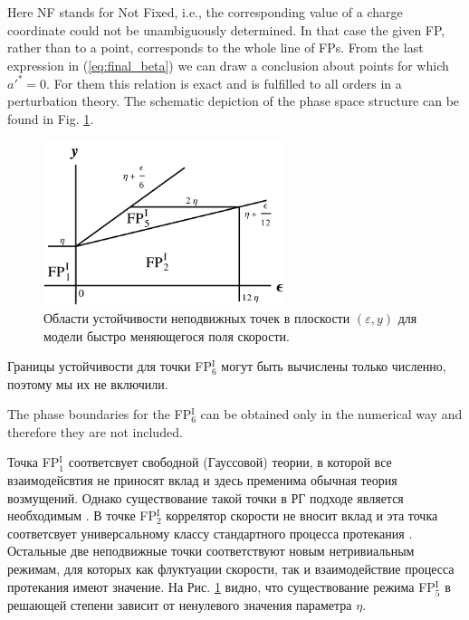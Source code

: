 \documentclass[12pt]{article}
\def\eps{\varepsilon}
\newcommand{\fp}[2]{FP$^{\textrm{#1}}_{#2}$}
\begin{document}
Here NF stands for Not Fixed, i.e., the corresponding value
of a charge coordinate could not be unambiguously determined. In that case the given FP,
rather than to a point, corresponds to the whole line of FPs. From the last
expression in (\ref{eq:final_beta}) we can draw a conclusion about points for which ${a'}^*=0$.
 For them this relation is exact and is fulfilled to all orders in a perturbation theory.
 The schematic depiction of the phase space structure can be found in Fig. \ref{fig:stab_rchm}.
\begin{figure}[h!]
  \centering
  \includegraphics[width=7cm]{Stab_reg_RCHM.pdf} 
  \caption{Области устойчивости неподвижных точек в плоскости $(\eps,y)$ для модели быстро меняющегося поля скорости.}
  \label{fig:stab_rchm}
\end{figure}

Границы устойчивости для точки \fp{I}{6} могут быть вычислены только численно, поэтому мы их не включили.

The phase boundaries for the \fp{I}{6} can be obtained only in the numerical way and therefore they are not included. 

Точка \fp{I}{1} соответсвует свободной (Гауссовой) теории, в которой все взаимодейсвтия не приносят вклад и здесь пременима обычная теория возмущений.
Однако существование такой точки в РГ подходе является необходимым \cite{Vasiliev}.
В точке \fp{I}{2} коррелятор скорости не вносит вклад и эта точка соответсвует универсальному классу стандартного процесса протекания \cite{JanTau04}.
Остальные две неподвижные точки соответствуют новым нетривиальным режимам, для которых как флуктуации скорости, так и взаимодействие процесса протекания имеют значение.
На Рис. \ref{fig:stab_rchm} видно, что существование режима \fp{I}{5} в решающей степени зависит от ненулевого значения параметра $\eta$.
\end{document}
